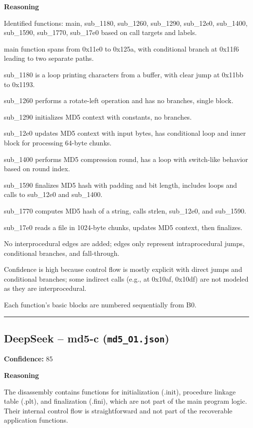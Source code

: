 \textbf{Reasoning}

Identified functions: main, sub\_1180, sub\_1260, sub\_1290, sub\_12e0, sub\_1400, sub\_1590, sub\_1770, sub\_17e0 based on call targets and labels.

main function spans from 0x11e0 to 0x125a, with conditional branch at 0x11f6 leading to two separate paths.

sub\_1180 is a loop printing characters from a buffer, with clear jump at 0x11bb to 0x1193.

sub\_1260 performs a rotate-left operation and has no branches, single block.

sub\_1290 initializes MD5 context with constants, no branches.

sub\_12e0 updates MD5 context with input bytes, has conditional loop and inner block for processing 64-byte chunks.

sub\_1400 performs MD5 compression round, has a loop with switch-like behavior based on round index.

sub\_1590 finalizes MD5 hash with padding and bit length, includes loops and calls to sub\_12e0 and sub\_1400.

sub\_1770 computes MD5 hash of a string, calls strlen, sub\_12e0, and sub\_1590.

sub\_17e0 reads a file in 1024-byte chunks, updates MD5 context, then finalizes.

No interprocedural edges are added; edges only represent intraprocedural jumps, conditional branches, and fall-through.

Confidence is high because control flow is mostly explicit with direct jumps and conditional branches; some indirect calls (e.g., at 0x10af, 0x10df) are not modeled as they are interprocedural.

Each function's basic blocks are numbered sequentially from B0.

\bigskip
\hrule
\bigskip

\subsection{DeepSeek -- md5-c (\texttt{md5\_O1.json})}

\textbf{Confidence:} 85

\textbf{Reasoning}

The disassembly contains functions for initialization (.init), procedure linkage table (.plt), and finalization (.fini), which are not part of the main program logic. Their internal control flow is straightforward and not part of the recoverable application functions.

